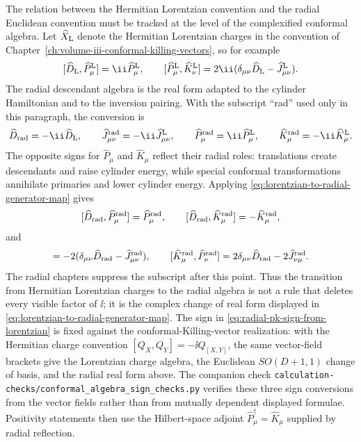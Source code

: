 The relation between the Hermitian Lorentzian convention and the radial
Euclidean convention must be tracked at the level of the complexified
conformal algebra.  Let \(\widehat X_{\rm L}\) denote the Hermitian
Lorentzian charges in the convention of
Chapter~\ref{ch:volume-iii-conformal-killing-vectors}, so for example
\[
  [\widehat D_{\rm L},\widehat P^{\rm L}_\mu]
  =
  \ii\widehat P^{\rm L}_\mu,
  \qquad
  [\widehat P^{\rm L}_\mu,\widehat K^{\rm L}_\nu]
  =
  2\ii
  (\delta_{\mu\nu}\widehat D_{\rm L}-\widehat J^{\rm L}_{\mu\nu}).
\]
The radial descendant algebra is the real form adapted to the cylinder
Hamiltonian and to the inversion pairing.  With the subscript ``rad'' used
only in this paragraph, the conversion is
\begin{equation}
  \widehat D_{\rm rad}=-\ii\widehat D_{\rm L},
  \qquad
  \widehat J^{\rm rad}_{\mu\nu}=-\ii\widehat J^{\rm L}_{\mu\nu},
  \qquad
  \widehat P^{\rm rad}_{\mu}=\ii\widehat P^{\rm L}_{\mu},
  \qquad
  \widehat K^{\rm rad}_{\mu}=-\ii\widehat K^{\rm L}_{\mu}.
  \label{eq:lorentzian-to-radial-generator-map}
\end{equation}
The opposite signs for \(\widehat P_\mu\) and \(\widehat K_\mu\) reflect
their radial roles: translations create descendants and raise cylinder
energy, while special conformal transformations annihilate primaries and
lower cylinder energy.  Applying \eqref{eq:lorentzian-to-radial-generator-map}
gives
\[
  [\widehat D_{\rm rad},\widehat P^{\rm rad}_\mu]
  =
  \widehat P^{\rm rad}_\mu,
  \qquad
  [\widehat D_{\rm rad},\widehat K^{\rm rad}_\mu]
  =
  -\widehat K^{\rm rad}_\mu,
\]
and
\begin{equation}
  [\widehat P^{\rm rad}_\mu,\widehat K^{\rm rad}_\nu]
  =
  -2(\delta_{\mu\nu}\widehat D_{\rm rad}
      -\widehat J^{\rm rad}_{\mu\nu}),
  \qquad
  [\widehat K^{\rm rad}_\mu,\widehat P^{\rm rad}_\nu]
  =
  2\delta_{\mu\nu}\widehat D_{\rm rad}
  -2\widehat J^{\rm rad}_{\nu\mu}.
  \label{eq:radial-pk-sign-from-lorentzian}
\end{equation}
The radial chapters suppress the subscript after this point.  Thus the
transition from Hermitian Lorentzian charges to the radial algebra is not a
rule that deletes every visible factor of \(\ii\); it is the complex change of
real form displayed in \eqref{eq:lorentzian-to-radial-generator-map}.
The sign in \eqref{eq:radial-pk-sign-from-lorentzian} is fixed against the
conformal-Killing-vector realization: with the Hermitian charge convention
\([Q_X,Q_Y]=-\ii Q_{[X,Y]}\), the same vector-field brackets give the
Lorentzian charge algebra, the Euclidean \(SO(D+1,1)\) change of basis, and the
radial real form above.  The companion check
\texttt{calculation-checks/conformal\_algebra\_sign\_checks.py} verifies these
three sign conversions from the vector fields rather than from mutually
dependent displayed formulae.
Positivity statements then use the Hilbert-space adjoint
\(\widehat P_\mu^\dagger=\widehat K_\mu\) supplied by radial reflection.

